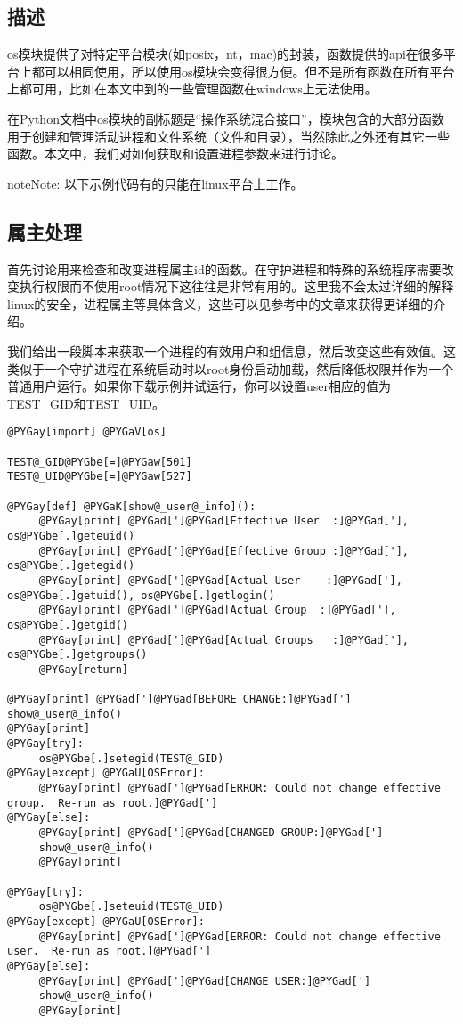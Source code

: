 \documentclass[a4paper,10pt,english]{manual}
\begin{document}
\subsection{描述}

os模块提供了对特定平台模块(如posix，nt，mac)的封装，函数提供的api在很多平台上都可以相同使用，所以使用os模块会变得很方便。但不是所有函数在所有平台上都可用，比如在本文中到的一些管理函数在windows上无法使用。

在Python文档中os模块的副标题是“操作系统混合接口”，模块包含的大部分函数用于创建和管理活动进程和文件系统（文件和目录），当然除此之外还有其它一些函数。本文中，我们对如何获取和设置进程参数来进行讨论。

\begin{notice}{note}{Note:}
以下示例代码有的只能在linux平台上工作。
\end{notice}


\subsection{属主处理}

首先讨论用来检查和改变进程属主id的函数。在守护进程和特殊的系统程序需要改变执行权限而不使用root情况下这往往是非常有用的。这里我不会太过详细的解释linux的安全，进程属主等具体含义，这些可以见参考中的文章来获得更详细的介绍。

我们给出一段脚本来获取一个进程的有效用户和组信息，然后改变这些有效值。这类似于一个守护进程在系统启动时以root身份启动加载，然后降低权限并作为一个普通用户运行。如果你下载示例并试运行，你可以设置user相应的值为TEST\_GID和TEST\_UID。

\begin{Verbatim}[commandchars=@\[\]]
@PYGay[import] @PYGaV[os]

TEST@_GID@PYGbe[=]@PYGaw[501]
TEST@_UID@PYGbe[=]@PYGaw[527]

@PYGay[def] @PYGaK[show@_user@_info]():
     @PYGay[print] @PYGad[']@PYGad[Effective User  :]@PYGad['], os@PYGbe[.]geteuid()
     @PYGay[print] @PYGad[']@PYGad[Effective Group :]@PYGad['], os@PYGbe[.]getegid()
     @PYGay[print] @PYGad[']@PYGad[Actual User    :]@PYGad['], os@PYGbe[.]getuid(), os@PYGbe[.]getlogin()
     @PYGay[print] @PYGad[']@PYGad[Actual Group  :]@PYGad['], os@PYGbe[.]getgid()
     @PYGay[print] @PYGad[']@PYGad[Actual Groups   :]@PYGad['], os@PYGbe[.]getgroups()
     @PYGay[return]

@PYGay[print] @PYGad[']@PYGad[BEFORE CHANGE:]@PYGad[']
show@_user@_info()
@PYGay[print]
@PYGay[try]:
     os@PYGbe[.]setegid(TEST@_GID)
@PYGay[except] @PYGaU[OSError]:
     @PYGay[print] @PYGad[']@PYGad[ERROR: Could not change effective group.  Re-run as root.]@PYGad[']
@PYGay[else]:
     @PYGay[print] @PYGad[']@PYGad[CHANGED GROUP:]@PYGad[']
     show@_user@_info()
     @PYGay[print]

@PYGay[try]:
     os@PYGbe[.]seteuid(TEST@_UID)
@PYGay[except] @PYGaU[OSError]:
     @PYGay[print] @PYGad[']@PYGad[ERROR: Could not change effective user.  Re-run as root.]@PYGad[']
@PYGay[else]:
     @PYGay[print] @PYGad[']@PYGad[CHANGE USER:]@PYGad[']
     show@_user@_info()
     @PYGay[print]
\end{Verbatim}
\end{document}
